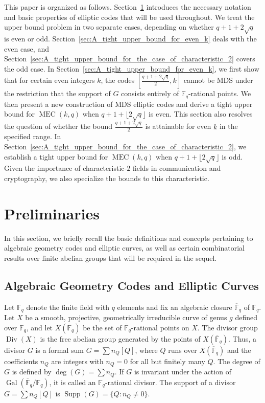 \documentclass[journal,12pt,onecolumn]{IEEEtran}
\begin{document}
This paper is organized as follows. Section~\ref{sec:preliminaries} introduces the necessary notation and basic properties of elliptic codes that will be used throughout. We treat the upper bound problem in two separate cases, depending on whether \( q+1 + 2\sqrt{q} \) is even or odd. Section~\ref{sec:A_tight_upper_bound_for_even_k} deals with the even case, and Section~\ref{sec:A_tight_upper_bound_for_the_case_of_characteristic_2} covers the odd case. In Section~\ref{sec:A_tight_upper_bound_for_even_k}, we first show that for certain even integers \(k\), the codes \([\frac{q+1+2\sqrt{q}}{2}, k]\) cannot be MDS under the restriction that the support of $G$ consists entirely of $\mathbb{F}_q$-rational points. We then present a new construction of MDS elliptic codes and derive a tight upper bound for \(\operatorname{MEC}(k,q)\) when \(q+1+ \lfloor 2\sqrt{q} \rfloor\) is even. This section also resolves the question of whether the bound \(\frac{q+1+2\sqrt{q}}{2}\) is attainable for even \(k\) in the specified range. In Section~\ref{sec:A_tight_upper_bound_for_the_case_of_characteristic_2},  we establish a tight upper bound for \(\operatorname{MEC}(k,q)\) when \(q+1+ \lfloor 2\sqrt{q} \rfloor\) is odd. Given the importance of characteristic‑\(2\) fields in communication and cryptography, we also specialize the bounds to this characteristic.

 




\section{Preliminaries}\label{sec:preliminaries}

In this section, we briefly recall the basic definitions and concepts pertaining to algebraic geometry codes and elliptic curves, as well as certain combinatorial results over finite abelian groups that will be required in the sequel.

\subsection{Algebraic Geometry Codes and Elliptic Curves}

Let $\mathbb{F}_q$ denote the finite field with $q$ elements and fix an algebraic closure $\overline{\mathbb{F}}_q$ of $\mathbb{F}_q$. Let $X$ be a smooth, projective, geometrically irreducible curve of genus $g$ defined over $\mathbb{F}_q$, and let $X(\overline{\mathbb{F}}_q)$ be the set of $\overline{\mathbb{F}}_q$-rational points on $X$. 
The divisor group $\operatorname{Div}(X)$ is the free abelian group generated by the points of $X(\overline{\mathbb{F}}_q)$. 
Thus, a divisor $G$ is a formal sum $G = \sum n_Q [Q]$, where $Q$ runs over $X(\overline{\mathbb{F}}_q)$ and the coefficients $n_Q$ are integers with $n_Q = 0$ for all but finitely many $Q$. The degree of $G$ is defined by $\deg(G) = \sum n_Q$. If $G$ is invariant under the action of $\operatorname{Gal}(\overline{\mathbb{F}}_q / \mathbb{F}_q)$, it is called an $\mathbb{F}_q$-rational divisor. The support of a divisor $G = \sum n_Q [Q]$ is $\operatorname{Supp}(G) = \{ Q : n_Q \neq 0 \}$.
\end{document}

